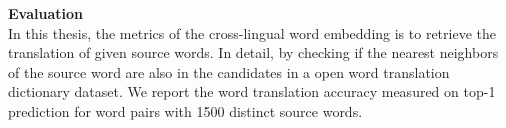\textbf{Evaluation}\\
In this thesis, the metrics of the cross-lingual word embedding is to retrieve the translation of given source words. In detail, by checking if the nearest neighbors of the source word are also in the candidates in a open word translation dictionary dataset. We report the word translation accuracy measured on top-1 prediction for word pairs with 1500 distinct source words.\\

